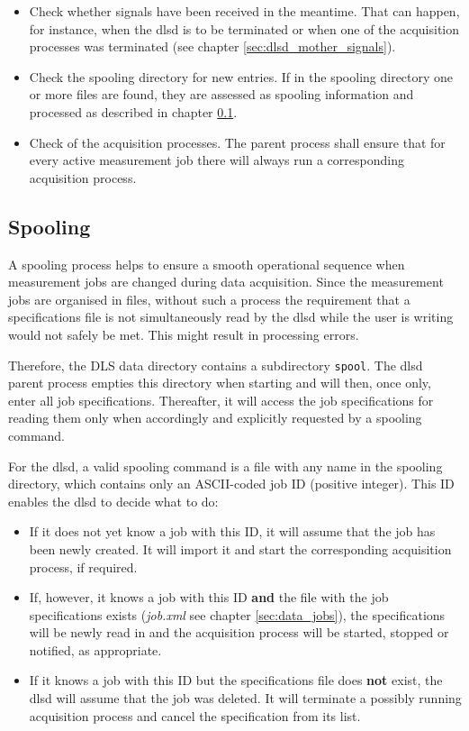 \documentclass[a4paper,12pt,BCOR6mm,bibtotoc,idxtotoc]{scrbook}
\begin{document}
\begin{itemize} 
\item Check whether signals have been received in the meantime. That can happen, for instance, when the dlsd is to be terminated or when one of the acquisition processes was terminated (see chapter \ref{sec:dlsd_mother_signals}). 
\item Check the spooling directory for new entries. If in the spooling directory one or more files are found, they are assessed as spooling information and processed as described in chapter \ref{sec:dlsd_mother_spooling}. 
\item Check of the acquisition processes. The parent process shall ensure that for every active measurement job there will always run a corresponding acquisition process. \end{itemize}


\subsection{Spooling} \label{sec:dlsd_mother_spooling} 

A spooling process helps to ensure a smooth operational sequence when measurement jobs  are changed during data acquisition. Since the measurement jobs are organised in files, without such a process the requirement that a specifications file is not simultaneously read by the dlsd while the user is writing would not safely be met. This might result in processing errors.

Therefore, the DLS data directory contains a subdirectory \texttt{spool}. The dlsd parent process empties this directory when starting and will then, once only, enter all job specifications. Thereafter, it will access the job specifications for reading them only when accordingly and explicitly requested by a spooling command.

For the dlsd, a valid spooling command is a file with any name in the spooling directory, which contains only an ASCII-coded job ID (positive integer). This ID enables the dlsd to decide what to do:

\begin{itemize} 
\item If it does not yet know a job with this ID, it will assume that the job has been newly created. It will import it and start the corresponding acquisition process, if required. 
\item If, however, it knows a job with this ID \textbf{and} the file
  with the job specifications exists (\textit{job.xml} see chapter \ref{sec:data_jobs}), the specifications will be newly read in and the acquisition process will be started, stopped or notified, as appropriate. 
\item If it knows a job with this ID but the specifications file does \textbf{not} exist, the dlsd will assume that the job was deleted. It will terminate a possibly running acquisition process and cancel the specification from its list. \end{itemize}
\end{document}
